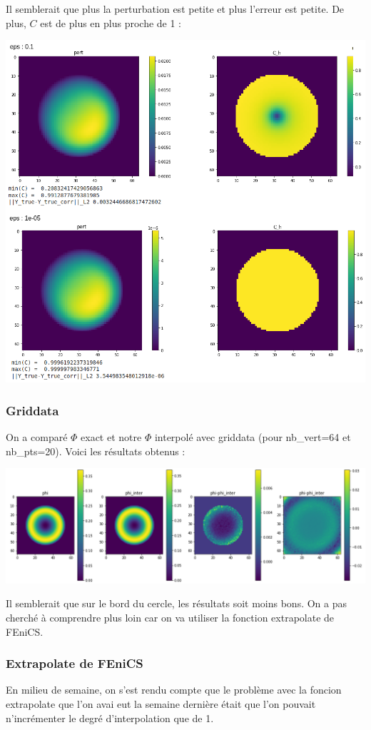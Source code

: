Il semblerait que plus la perturbation est petite et plus l'erreur est petite. De plus, $C$ est de plus en plus proche de 1 :

\begin{minipage}{\linewidth}
	\centering
	\includegraphics[width=0.55\linewidth]{results_perturb.png}
\end{minipage}

\subsubsection*{Griddata}

On a comparé $\Phi$ exact et notre $\Phi$ interpolé avec griddata (pour nb\_vert=64 et nb\_pts=20). Voici les résultats obtenus :

\begin{minipage}{\linewidth}
	\centering
	\includegraphics[width=0.9\linewidth]{results_griddata.png}
\end{minipage}

Il semblerait que sur le bord du cercle, les résultats soit moins bons. On a pas cherché à comprendre plus loin car on va utiliser la fonction extrapolate de FEniCS.


\subsubsection*{Extrapolate de FEniCS}

En milieu de semaine, on s'est rendu compte que le problème avec la foncion extrapolate que l'on avai eut la semaine dernière était que l'on pouvait n'incrémenter le degré d'interpolation que de 1.

